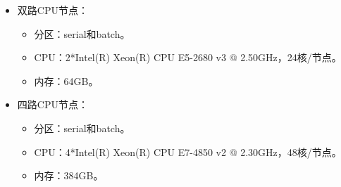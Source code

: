 \begin{itemize}
	\item 双路CPU节点：
\begin{itemize}
	\item 分区：serial和batch。
	\item CPU：2*Intel(R) Xeon(R) CPU E5-2680 v3 @ 2.50GHz，24核/节点。
	\item 内存：64GB。
\end{itemize}
	\item 四路CPU节点：
\begin{itemize}
	\item 分区：serial和batch。
	\item CPU：4*Intel(R) Xeon(R) CPU E7-4850 v2 @ 2.30GHz，48核/节点。
	\item 内存：384GB。
\end{itemize}
\end{itemize}

